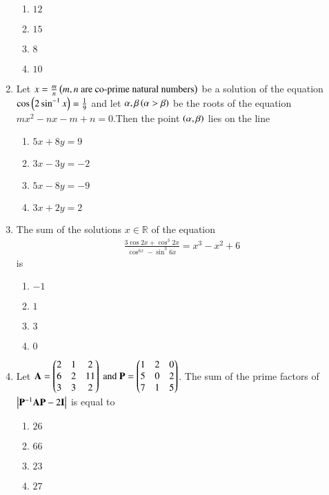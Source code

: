 \documentclass[journal]{IEEEtran}
\begin{document}
\begin{enumerate}
\begin{multicols}{2}
		\begin{enumerate}
			\item $12$
			\item $15$\\
			\item $8$
			\item $10$
		\end{enumerate}
	\end{multicols}
\item Let $x = \frac{m}{n} \left( m , n \text{ are co-prime natural numbers}\right)$ be a solution of the equation $\cos \left(2\sin^{-1}x\right)=\frac{1}{9}$ and let $\alpha,\beta \left(\alpha > \beta\right)$ be the roots of the equation $mx^2 - nx - m + n=0$.Then the point $\left(\alpha,\beta\right)$ lies on the line 
	\begin{enumerate}
		\item $5x + 8y = 9$
		\item $3x - 3y = -2$
		\item $5x - 8y = -9$
		\item $3x + 2y = 2$
	\end{enumerate}
\item The sum of the solutions $x \in \mathbb{R}$ of the equation 
	\begin{align}
		\frac{3\cos{2x}+\cos^3{2x}}{\cos^{6x}-\sin^3{6x}} = x^3 - x^2 + 6
	\end{align}
	is
	\begin{multicols}{2}
		\begin{enumerate}
			\item $-1$
			\item $1$
			\item $3$
			\item $0$
		\end{enumerate}
	\end{multicols}
\item Let $\mathbf{A} = \begin{pmatrix} 2 & 1 & 2 \\ 6 & 2 & 11 \\ 3 & 3 & 2\end{pmatrix} \text{ and } \mathbf{P} = \begin{pmatrix} 1 & 2 & 0 \\ 5 & 0 & 2 \\ 7 & 1 & 5\end{pmatrix} $. The sum of the prime factors of $\left\vert\mathbf{P}^{-1}\mathbf{AP}-2\mathbf{I}\right\vert$ is equal to
	\begin{multicols}{2}
		\begin{enumerate}
			\item $26$
			\item $66$
			\item $23$
			\item $27$

\end{enumerate}
\end{multicols}
\end{enumerate}
\end{document}
